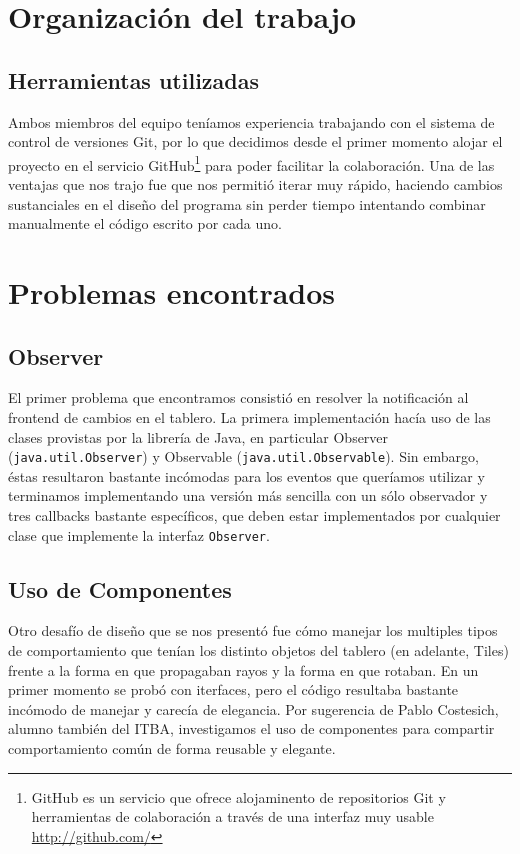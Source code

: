 \documentclass[a4paper, 11pt]{article}
\begin{document}
\section{Organización del trabajo}

	\subsection{Herramientas utilizadas}
	Ambos miembros del equipo teníamos experiencia trabajando con el sistema de control de versiones Git, por lo que decidimos desde el primer momento alojar el proyecto en el servicio GitHub\footnote{GitHub es un servicio que ofrece alojaminento de repositorios Git y herramientas de colaboración a través de una interfaz muy usable \href{http://github.com/}{http://github.com/}} para poder facilitar la colaboración. Una de las ventajas que nos trajo fue que nos permitió iterar muy rápido, haciendo cambios sustanciales en el diseño del programa sin perder tiempo intentando combinar manualmente el código escrito por cada uno.

\section{Problemas encontrados}

	\subsection{Observer}
	El primer problema que encontramos consistió en resolver la notificación al frontend de cambios en el tablero. La primera implementación hacía uso de las clases provistas por la librería de Java, en particular Observer (\texttt{java.util.Observer}) y Observable (\texttt{java.util.Observable}). Sin embargo, éstas resultaron bastante incómodas para los eventos que queríamos utilizar y terminamos implementando una versión más sencilla con un sólo observador y tres callbacks bastante específicos, que deben estar implementados por cualquier clase que implemente la interfaz \texttt{Observer}.

	\subsection{Uso de Componentes}
	Otro desafío de diseño que se nos presentó fue cómo manejar los multiples tipos de comportamiento que tenían los distinto objetos del tablero (en adelante, Tiles) frente a la forma en que propagaban rayos y la forma en que rotaban. En un primer momento se probó con iterfaces, pero el código resultaba bastante incómodo de manejar y carecía de elegancia. Por sugerencia de Pablo Costesich, alumno también del ITBA, investigamos el uso de componentes para compartir comportamiento común de forma reusable y elegante.
\end{document}
